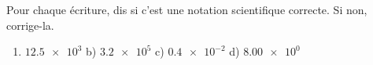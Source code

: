 \documentclass[11pt,a4paper]{article}
\begin{document}
\begin{exo}
Pour chaque écriture, dis si c'est une notation scientifique correcte. Si non, corrige-la.
\begin{enumerate}[label=\alph*),leftmargin=1.6em,itemsep=1pt]
  \item $\num{12,5e3}$ \qquad b) $\num{3,2e5}$ \qquad c) $\num{0,4e-2}$ \qquad d) $\num{8,00e0}$
\end{enumerate}
\end{exo}
\end{document}

